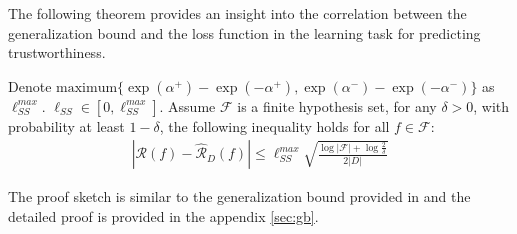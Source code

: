 The following theorem provides an insight into the correlation between the generalization bound and the loss function in the learning task for predicting trustworthiness.
\begin{theorem}%
	Denote $\text{maximum}\{\exp(\alpha^{+})-\exp(-\alpha^{+}), \exp(\alpha^{-})-\exp(-\alpha^{-})\}$ as $\ell_{SS}^{max}$. $\ell_{SS}\in [0, \ell_{SS}^{max}]$. Assume $\mathcal{F}$ is a finite hypothesis set, for any $\delta>0$, with probability at least $1-\delta$, the following inequality holds for all $f\in \mathcal{F}$:
	\begin{align*}
	|\mathcal{R}(f) - \hat{\mathcal{R}}_{D}(f) | \le  \ell^{max}_{SS}\sqrt{\frac{\log|\mathcal{F}|+\log\frac{2}{\delta}}{2|D|}}
	\end{align*}
	\label{thrm:gb}
\end{theorem}
The proof sketch is similar to the generalization bound provided in \cite{Mohri_MIT_2018} and the detailed proof is provided in the appendix \ref{sec:gb}.

